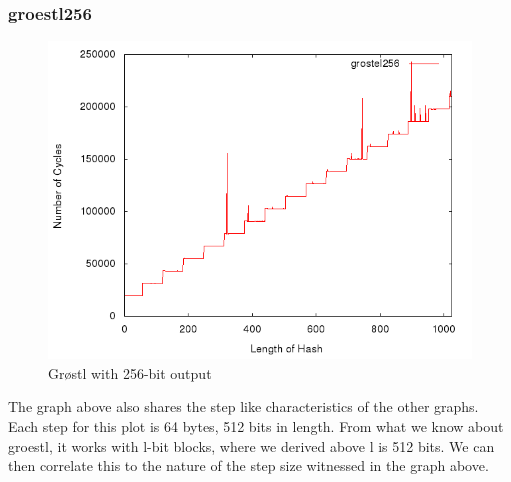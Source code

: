 \documentclass[10pt,a4paper]{article}
\begin{document}
\subsubsection{groestl256}
    \begin{figure}[H]
        \begin{center}
            \includegraphics[scale=0.5]{images/grostel256.png} 
            \caption{Gr{\o}stl with 256-bit output}
        \end{center}
    \end{figure}
The graph above also shares the step like characteristics of the other graphs. Each step for this plot is 64 bytes, 512 bits in length. From what we know about groestl, it works with l-bit blocks, where we derived above l is 512 bits. We can then correlate this to the nature of the step size witnessed in the graph above.
\end{document}
